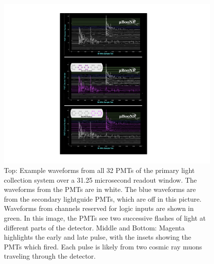 
\begin{figure}
\centering 
\includegraphics[height=0.7\textheight]{./figures/eventtriplet.pdf}
\caption{Top:  Example waveforms from all 32 PMTs of the primary light collection system over a 31.25 microsecond readout window.  The waveforms from the PMTs are in white.  The blue waveforms are from the secondary lightguide PMTs, which are off in this picture.  Waveforms from channels reserved for logic inputs are shown in green.  In this image, the PMTs see two successive flashes of light at different parts of the detector.  Middle and Bottom:   Magenta highlights the early and late pulse, with the insets showing the PMTs which fired.   Each pulse is likely from two cosmic ray muons traveling through the detector.}
 \label{fig:example_readout}
 \end{figure}

